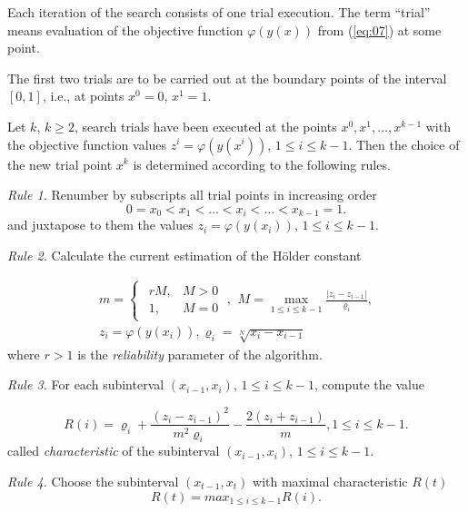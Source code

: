 \documentclass[runningheads]{llncs}
\begin{document}
Each iteration of the search consists of one trial execution. The term ``trial'' means evaluation of the objective function $\varphi(y(x))$ from (\ref{eq:07}) at some point.

The first two trials are to be carried out at the boundary points of the interval $[0,1]$, i.e., at points $x^0=0$, $x^1=1$. 

Let $k$, $k \geq 2$, search trials have been executed at the points $x^0, x^1,\dots,x^{k-1}$ with the objective function values $z^i=\varphi(y(x^i))$, $1 \leq i \leq k-1$. Then the choice of the new trial point $x^k$ is determined according to the following rules.

\textit{Rule 1.} Renumber by subscripts all trial points in increasing order
\begin{equation}
    \label{eq:09}
    0 = x_0 < x_1 < \dots < x_i < \dots < x_{k-1} = 1.
\end{equation}
and juxtapose to them the values $z_i=\varphi(y(x_i))$, $1 \leq i \leq k-1$.

\textit{Rule 2.} Calculate the current estimation of the H{\" o}lder constant 

\begin{equation}
    \label{eq:10}
		\begin{matrix}
		m=\begin{cases}
				\begin{matrix}
					 r M, & M >0 \\
					 1, & M = 0 
				\end{matrix} \; , 
			\end{cases}
		M = \max_{1 \leq i \leq k-1} \frac{| z_i - z_{i-1}|}{\varrho_i}, \\
		z_i = \varphi( y(x_i) ), \varrho_i=\sqrt[N]{x_i-x_{i-1}}
		\end{matrix}
\end{equation}
where $r>1$ is the \textit{reliability} parameter of the algorithm.

\textit{Rule 3.} For each subinterval $(x_{i-1} ,x_i)$, $1 \leq i \leq k-1$, compute the value

\begin{equation}
    \label{eq:11}
    R(i) = \varrho_i + \frac{(z_i-z_{i-1})^2}{m^2 \varrho_i} - \frac{2 (z_i+z_{i-1})}{m}, 1 \leq i \leq k-1.
\end{equation}
called \textit{characteristic} of the subinterval $(x_{i-1} ,x_i)$, $1 \leq i \leq k-1$.

\textit{Rule 4.} Choose the subinterval $(x_{t-1} ,x_t)$ with maximal characteristic $R(t)$
\begin{equation}
    \label{eq:12}
    R(t) = max_{1 \leq i \leq k-1} {R(i)}.
\end{equation}
\end{document}
